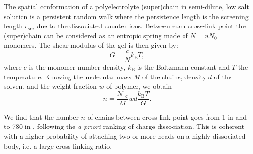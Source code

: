 \documentclass[12pt,a4paper]{article}
\begin{document}
The spatial conformation of a polyelectrolyte (super)chain in semi-dilute, low salt solution is a persistent random walk where the persistence length is the screening length $r_\mathrm{src}$ due to the dissociated counter ions. Between each cross-link point the (super)chain can be considered as an entropic spring made of $N=n N_0$ monomers. The shear modulus of the gel is then given by:
\begin{equation}
G = \frac{c}{N}k_\mathrm{B}T,
\label{eq:G}
\end{equation}
where $c$ is the monomer number density, $k_\mathrm{B}$ is the Boltzmann constant and $T$ the temperature. Knowing the molecular mass $M$ of the chains, density $d$ of the solvent and the weight fraction $w$ of polymer, we obtain
\begin{equation}
n = \frac{\mathcal{N_A}}{M} w d \frac{k_\mathrm{B}T}{G}.
\end{equation}

We find that the number $n$ of chains between cross-link point goes from 1 in  and  to 780 in , following the \textit{a priori} ranking of charge dissociation. This is coherent with a higher probability of attaching two or more heads on a highly dissociated body, i.e. a large cross-linking ratio.
\end{document}
